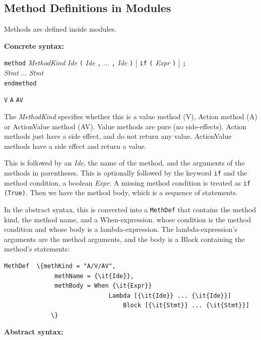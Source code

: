 \documentclass[11pt]{article}
\newcommand{\hm}{\hspace*{1em}}
\newcommand{\nterm}[1]{\emph{#1}}
\newcommand{\term}[1]{\texttt{#1}}
\newcommand{\many}[2]{#1 #2 ... #2 #1}
\newcommand{\opt}[1]{[ #1 ]}
\newcommand{\alt}{{$\mid$}}
\newcommand{\gram}[2]{    \hm\makebox[10em][l]{\it #1}\makebox[1.5em][l]{::=}    #2}
\newcommand{\grammore}[1]{\hm\makebox[10em][l]{      }\makebox[1.5em][l]{}       #1}
\begin{document}

\subsection{Method Definitions in Modules}

Methods are defined inside modules.

{\bf Concrete syntax:}

\gram{MethodDef}{\term{method} \nterm{MethodKind} \nterm{Ide}
                 \term{(} \many{\nterm{Ide}}{\term{,}} \term{)}         %
                 \opt{\term{if} \term{(} \nterm{Expr} \term{)}}        %
                 \term{;}} \\
\grammore{\hm \many{\nterm{Stmt}}{\hm}} \\
\grammore{\term{endmethod}}

\gram{MethodKind}{\term{V} \hm \alt \hm \term{A} \hm \alt \hm \term{AV}}

The \nterm{MethodKind} specifies whether this is a value method (V),
Action method (A) or ActionValue method (AV).  Value methods are pure
(no side-effects). Action methods just have a side effect, and do not
return any value. ActionValue methods have a side effect and return a
value.

This is followed by an \nterm{Ide}, the name of the method, and the
arguments of the methods in parentheses. This is optionally followed
by the keyword \term{if} and the method condition, a boolean
\nterm{Expr}. A missing method condition is treated as \verb|if (True)|.
Then we have the method body, which is a sequence of
statements.

In the abstract syntax, this is converted into a \term{MethDef} that
contains the method kind, the method name, and a When-expression.
whose condition is the method condition and whose body is a
lambda-expression.  The lambda-expression's arguments are the method
arguments, and the body is a Block containing the method's statements:

\begin{Verbatim}[frame=single, commandchars=\\\{\}]
    MethDef  \{methKind = "A/V/AV",
              methName = {\it{Ide}},
              methBody = When {\it{Expr}}
                             Lambda [{\it{Ide}} ... {\it{Ide}}]
                                 Block [{\it{Stmt}} ... {\it{Stmt}}]
             \}
\end{Verbatim}


{\bf Abstract syntax:}
\end{document}
